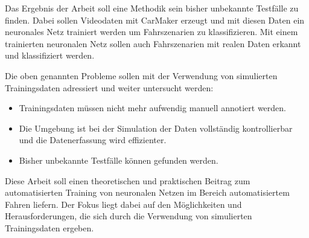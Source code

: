 Das Ergebnis der Arbeit soll eine Methodik sein bisher unbekannte Testfälle zu finden. Dabei sollen Videodaten mit CarMaker erzeugt und mit diesen Daten ein neuronales Netz trainiert werden um Fahrszenarien zu klassifizieren. Mit einem trainierten neuronalen Netz sollen auch Fahrszenarien mit realen Daten erkannt und klassifiziert werden.

Die oben genannten Probleme sollen mit der Verwendung von simulierten Trainingsdaten adressiert und weiter untersucht werden:

\begin{itemize}
\item Trainingsdaten müssen nicht mehr aufwendig manuell annotiert werden.
\item Die Umgebung ist bei der Simulation der Daten vollständig kontrollierbar und die Datenerfassung wird effizienter.
\item Bisher unbekannte Testfälle können gefunden werden.
\end{itemize}

Diese Arbeit soll einen theoretischen und praktischen Beitrag zum automatisierten Training von neuronalen Netzen im Bereich automatisiertem Fahren liefern. Der Fokus liegt dabei auf den Möglichkeiten und Herausforderungen, die sich durch die Verwendung von simulierten Trainingsdaten ergeben.

